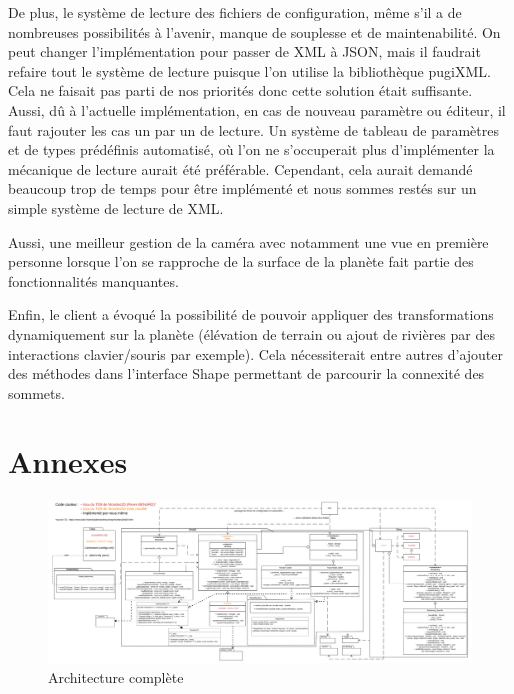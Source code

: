 \documentclass[a4paper]{article}
\begin{document}
De plus, le système de lecture des fichiers de configuration, même s'il a de nombreuses possibilités à l'avenir, manque de souplesse et de maintenabilité. On peut changer l'implémentation pour passer de XML à JSON, mais il faudrait refaire tout le système de lecture puisque l'on utilise la bibliothèque pugiXML. Cela ne faisait pas parti de nos priorités donc cette solution était suffisante. Aussi, dû à l'actuelle implémentation, en cas de nouveau paramètre ou éditeur, il faut rajouter les cas un par un de lecture. Un système de tableau de paramètres et de types prédéfinis automatisé, où l'on ne s'occuperait plus d'implémenter la mécanique de lecture aurait été préférable. Cependant, cela aurait demandé beaucoup trop de temps pour être implémenté et nous sommes restés sur un simple système de lecture de XML.

Aussi, une meilleur gestion de la caméra avec notamment une vue en première personne lorsque l'on se rapproche de la surface de la planète fait partie des fonctionnalités manquantes.

Enfin, le client a évoqué la possibilité de pouvoir appliquer des transformations dynamiquement sur la planète (élévation de terrain ou ajout de rivières par des interactions clavier/souris par exemple). Cela nécessiterait entre autres d'ajouter des méthodes dans l'interface Shape permettant de parcourir la connexité des sommets.

\newpage
\section{Annexes}

\begin{figure}[!ht]
    \begin{center}
        \includegraphics[width=1.5\linewidth, angle=90]{img/archi/Archi_Complete.png} 
        \caption{Architecture complète}
        \label{archiComplete}
    \end{center}
\end{figure}




\end{document}
